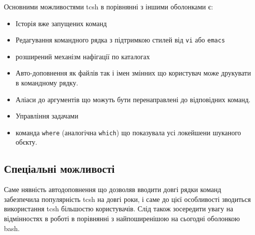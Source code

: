   Основними можливостями tcsh в порівнянні з іншими оболонками є:
  \begin{itemize}
    \item Історія вже запущених команд
    \item Редагування командного рядка з підтримкою стилей від \texttt{vi} або \texttt{emacs}
    \item розширений механізм нафігації по каталогах
    \item Авто-доповнення як файлів так і імен змінних що користувач може друкувати в командному рядку.
    \item Аліаси до аргументів що можуть бути перенаправлені до відповідних команд.
    \item Управління задачами
    \item команда \texttt{where} (аналогічна \texttt{which}) що показувала усі локейшени шуканого обєкту.
  \end{itemize}

  \subsection{Спеціальні можливості}
  Саме нявність автодоповнення що дозволяв вводити довгі рядки команд забезпечила популярність tcsh на довгі роки, і саме до цієї особливості зводиться використання tcsh більшостю користувачів. Слід також зосередити увагу на відмінностях в роботі в порівнянні з найпоширенішою на сьогодні оболонкою bash.

